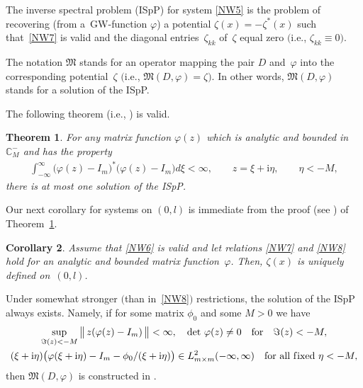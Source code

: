 \documentclass[pdftex]{sigma}
\newtheorem{Theorem}{Theorem}[section]
\newtheorem{Corollary}[Theorem]{Corollary}
\def\vp{\varphi}
\def\BC{{\mathbb C}}
\newcommand{\I}{\mathrm{i}}
\def\mf{\mathfrak}
\numberwithin{equation}{section}
\begin{document}
The inverse spectral problem (ISpP) for system
\eqref{NW5} is the problem of recovering (from a~GW-function $\varphi$)
a potential
$\zeta (x) = - \zeta^* (x)$
 such that~\eqref{NW7} is valid and the diagonal entries~$\zeta_{kk}$ of~$\zeta$ equal zero $($i.e., $\zeta_{kk} \equiv 0)$.

\begin{Notation}
The notation $\mf M$
stands for
an operator mapping the pair $D$ and~$\varphi $
into the corresponding potential~$\zeta$
$($i.e., ${\mf M} (D, \varphi) = \zeta)$. In other words, ${\mf M} (D, \varphi)$ stands for a solution of the ISpP.
\end{Notation}


\noindent The following theorem (i.e., \cite[Theorem 4.8]{SaSaR}) is valid.
\begin{Theorem}\label{NWTmUniq}
For any
matrix function
$\varphi (z)$ which is
analytic and bounded in
$\BC^{-}_M$
and has the
property
\begin{gather}
  \int_{- \infty}^\infty
   \bigl(
    \varphi (z) - I_m
   \bigr)^*
   \bigl(
    \varphi (z) - I_m
   \bigr)
  d \xi
  < \infty,
\qquad
  z = \xi + \I \eta,
  \qquad
  \eta <- M ,
 \label{NW8}
\end{gather}
there is at most one solution of the ISpP.
\end{Theorem}
Our next corollary for systems on $(0,l)$ is immediate from the proof (see \cite[pp.~108--109]{SaSaR}) of Theorem~\ref{NWTmUniq}.

\begin{Corollary} \label{CyUniq} Assume that \eqref{NW6} is valid and let relations \eqref{NW7} and \eqref{NW8} hold
for an analytic and bounded matrix function~$\vp$. Then, $\zeta(x)$ is uniquely defined on~$(0,l)$.
\end{Corollary}

\begin{Remark}\label{NWInvPr} Under somewhat stronger $($than in~\eqref{NW8}$)$
restrictions, the solution of the ISpP always exists. Namely, if for some matrix $\phi_0$ and some $M>0$
 we have
\begin{gather} \label{NW9}
\sup_{\Im(z)<-M}
   \big\| \,
   z ( \varphi (z) - I_m) \,
   \big\|
   < \infty, \quad \det \, \varphi (z) \not= 0 \quad {\mathrm{for}} \quad \Im(z) <-M,
     \\
   (\xi+\I\eta)\big( \varphi (\xi+\I\eta) - I_m - \phi_0 / (\xi+\I \eta) \big)
   \in L_{m \times m}^2 (- \infty, \infty)
   \quad \text{for all f\/ixed} \
   \eta<-M,
 \label{NW10}
\end{gather}
then ${\mf M} (D, \varphi)$ is constructed in \cite[Theorem~4.10]{SaSaR}.
\end{Remark}
\end{document}
